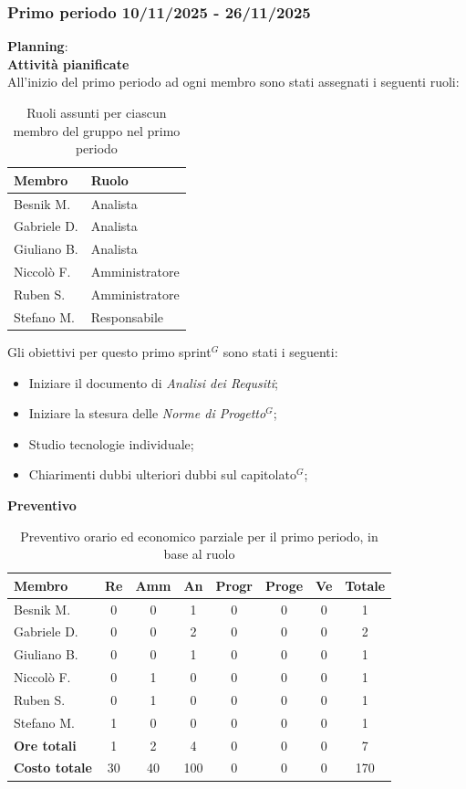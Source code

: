 \documentclass[a4paper,10pt]{article}
\begin{document}
\newpage

\subsubsection{Primo periodo 10/11/2025 - 26/11/2025}
\textbf{Planning}: \\
\textbf{Attività pianificate} \\ All'inizio del primo periodo ad ogni membro sono stati assegnati i seguenti ruoli: 
\begin{table}[H]
\centering
\begin{tabular}{|l|l|}
\hline
\textbf{Membro} & \textbf{Ruolo} \\
\hline
Besnik M.  & Analista \\
\hline
Gabriele D.  & Analista \\
\hline
Giuliano B. & Analista \\
\hline
Niccolò F. & Amministratore \\
\hline
Ruben S. & Amministratore \\
\hline
Stefano M.  & Responsabile\\
\hline
\end{tabular}
\caption{Ruoli assunti per ciascun membro del gruppo nel primo periodo}
\end{table}

Gli obiettivi per questo primo sprint$^G$ sono stati i seguenti:
\begin{itemize}
  \item Iniziare il documento di \textit{Analisi dei Requsiti};
  \item Iniziare la stesura delle \textit{Norme di Progetto$^G$};
  \item Studio tecnologie individuale;
  \item Chiarimenti dubbi ulteriori dubbi sul capitolato$^G$;
\end{itemize}


\textbf{Preventivo} \\
\begin{table}[H]
\centering
\begin{tabular}{|l|c|c|c|c|c|c|c|}
\hline
\textbf{Membro} & \textbf{Re} & \textbf{Amm} & \textbf{An} & \textbf{Progr} & \textbf{Proge} & \textbf{Ve} & \textbf{Totale} \\
\hline
Besnik M.  & 0 & 0 & 1 & 0 & 0 & 0 & 1 \\
Gabriele D. & 0 & 0 & 2 & 0 & 0 & 0 & 2 \\
Giuliano B. & 0 & 0 & 1 & 0 & 0 & 0 & 1 \\
Niccolò F.  & 0 & 1 & 0 & 0 & 0 & 0 & 1 \\
Ruben S. & 0 & 1 & 0 & 0 & 0 & 0 & 1 \\
Stefano M. & 1 & 0 & 0 & 0 & 0 & 0 & 1 \\
\hline
\textbf{Ore totali} & 1 & 2 & 4 & 0 & 0 & 0 & 7 \\
\hline
\textbf{Costo totale} & 30 & 40 & 100 & 0 & 0 & 0 & 170 \\
\hline
\end{tabular}
\caption{Preventivo orario ed economico parziale per il primo periodo, in base al ruolo}
\end{table}
\end{document}
